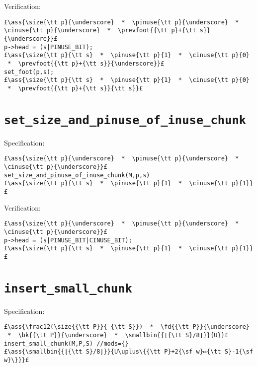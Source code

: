 \documentclass[10pt,twoside]{report}
\makeatletter
\newcommand{\ml}[2][t]{\mbox{\mdseries\begin{tabular}[#1]{@{}L@{}}#2\end{tabular}}}
\newcommand{\ass}[1]{\ensuremath{{\color{blue}\left\{\ml[c]{#1}\right\}}}}
\makeatother
\begin{document}
\noindent Verification:
\begin{lstlisting}
£\ass{\size{\tt p}{\underscore}  *  \pinuse{\tt p}{\underscore}  *  \cinuse{\tt p}{\underscore}  *  \prevfoot{{\tt p}+{\tt s}}{\underscore}}£
p->head = (s|PINUSE_BIT);
£\ass{\size{\tt p}{\tt s}  *  \pinuse{\tt p}{1}  *  \cinuse{\tt p}{0}  *  \prevfoot{{\tt p}+{\tt s}}{\underscore}}£
set_foot(p,s);
£\ass{\size{\tt p}{\tt s}  *  \pinuse{\tt p}{1}  *  \cinuse{\tt p}{0}  *  \prevfoot{{\tt p}+{\tt s}}{\tt s}}£
\end{lstlisting}

\section{\tt set\_size\_and\_pinuse\_of\_inuse\_chunk}

Specification:
\begin{lstlisting}
£\ass{\size{\tt p}{\underscore}  *  \pinuse{\tt p}{\underscore}  *  \cinuse{\tt p}{\underscore}}£
set_size_and_pinuse_of_inuse_chunk(M,p,s)
£\ass{\size{\tt p}{\tt s}  *  \pinuse{\tt p}{1}  *  \cinuse{\tt p}{1}}£
\end{lstlisting}

\noindent Verification:
\begin{lstlisting}
£\ass{\size{\tt p}{\underscore}  *  \pinuse{\tt p}{\underscore}  *  \cinuse{\tt p}{\underscore}}£
p->head = (s|PINUSE_BIT|CINUSE_BIT);
£\ass{\size{\tt p}{\tt s}  *  \pinuse{\tt p}{1}  *  \cinuse{\tt p}{1}}£
\end{lstlisting}


\section{\tt insert\_small\_chunk}

Specification:
\begin{lstlisting}
£\ass{\frac12(\size{{\tt P}}{ {\tt S}})  *  \fd{{\tt P}}{\underscore}  *  \bk{{\tt P}}{\underscore}  *  \smallbin{{⌊{\tt S}/8⌋}}{U}}£
insert_small_chunk(M,P,S) //mods={}
£\ass{\smallbin{{⌊{\tt S}/8⌋}}{U\uplus\{{\tt P}+2{\sf w}↦{\tt S}-1{\sf w}\}}}£
\end{lstlisting}
\end{document}

